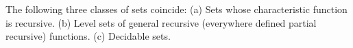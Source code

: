 The following three classes of sets coincide:
(a) Sets whose characteristic function is recursive.
(b) Level sets of general recursive (everywhere defined partial recursive) functions.
(c) Decidable sets.